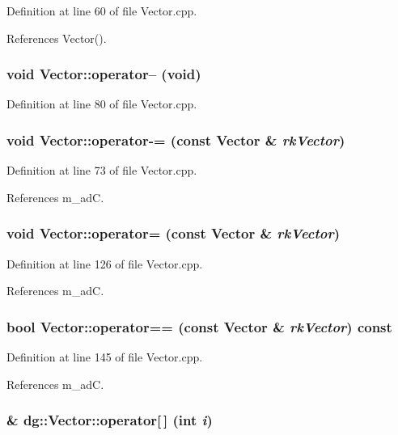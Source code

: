 Definition at line 60 of file Vector.cpp.

References Vector().
\subsubsection{\setlength{\rightskip}{0pt plus 5cm}void Vector::operator-- (void)}\label{classdg_1_1Vector_a20}




Definition at line 80 of file Vector.cpp.
\subsubsection{\setlength{\rightskip}{0pt plus 5cm}void Vector::operator-= (const Vector \& {\em rk\-Vector})}\label{classdg_1_1Vector_a19}




Definition at line 73 of file Vector.cpp.

References m\_\-ad\-C.
\subsubsection{\setlength{\rightskip}{0pt plus 5cm}void Vector::operator= (const Vector \& {\em rk\-Vector})}\label{classdg_1_1Vector_a27}




Definition at line 126 of file Vector.cpp.

References m\_\-ad\-C.
\subsubsection{\setlength{\rightskip}{0pt plus 5cm}bool Vector::operator== (const Vector \& {\em rk\-Vector}) const}\label{classdg_1_1Vector_a28}




Definition at line 145 of file Vector.cpp.

References m\_\-ad\-C.
\subsubsection{ \& dg::Vector::operator[$\,$] (int {\em i})\hspace{0.3cm}{\tt  [inline]}}\label{classdg_1_1Vector_a13}





